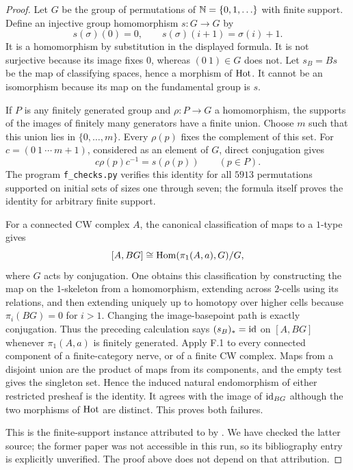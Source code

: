\begin{proof}
Let $G$ be the group of permutations of $\mathbb N=\{0,1,\ldots\}$ with finite
support. Define an injective group homomorphism $s:G\to G$ by
\[
 s(\sigma)(0)=0,\qquad s(\sigma)(i+1)=\sigma(i)+1.
\]
It is a homomorphism by substitution in the displayed formula. It is not
surjective because its image fixes $0$, whereas $(0\ 1)\in G$ does not.
Let $s_B=Bs$ be the map of classifying spaces, hence a morphism of
$\mathrm{Hot}$. It cannot be an isomorphism because its map on the fundamental
group is $s$.

If $P$ is any finitely generated group and $\rho:P\to G$ a homomorphism,
the supports of the images of finitely many generators have a finite
union. Choose $m$ such that this union lies in $\{0,\ldots,m\}$. Every
$\rho(p)$ fixes the complement of this set. For
$c=(0\ 1\ \cdots\ m+1)$, considered as an element of $G$, direct
conjugation gives
\[
       c\rho(p)c^{-1}=s(\rho(p))\qquad(p\in P).
\]
The program \texttt{f\_checks.py} verifies this identity for all
$5913$ permutations supported on initial sets of sizes one through
seven; the formula itself proves the identity for arbitrary finite
support.

For a connected CW complex $A$, the canonical classification of maps
to a $1$-type gives
\[
 [A,BG]\cong\operatorname{Hom}(\pi_1(A,a),G)/G,
\]
where $G$ acts by conjugation. One obtains this classification by
constructing the map on the $1$-skeleton from a homomorphism, extending
across $2$-cells using its relations, and then extending uniquely up to
homotopy over higher cells because $\pi_i(BG)=0$ for $i>1$.
Changing the image-basepoint path is exactly conjugation. Thus the
preceding calculation says $(s_B)_*=\mathrm{id}$ on $[A,BG]$ whenever
$\pi_1(A,a)$ is finitely generated. Apply F.1 to every connected component
of a finite-category nerve, or of a finite CW complex. Maps from a
disjoint union are the product of maps from its components, and the
empty test gives the singleton set. Hence the induced natural
endomorphism of either restricted presheaf is the identity. It agrees
with the image of $\mathrm{id}_{BG}$ although the two morphisms of $\mathrm{Hot}$ are
distinct. This proves both failures.

This is the finite-support instance attributed to
\citet[Proposition~4.1]{MatumotoMinamiSugawara1984} by
\citet[Remark~2.3]{ArlinChristensen2023}. We have checked the latter source;
the former paper was not accessible in this run, so its bibliography
entry is explicitly unverified. The proof above does not depend on
that attribution.
\end{proof}

